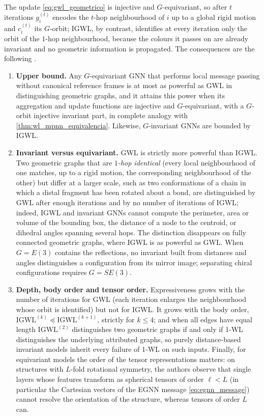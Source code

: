 The update \eqref{eq:gwl_geometrico} is injective and $G$-equivariant, so after $t$ iterations $g_i^{(t)}$ encodes the $t$-hop neighbourhood of $i$ up to a global rigid motion and $c_i^{(t)}$ its $G$-orbit; IGWL, by contrast, identifies at every iteration only the orbit of the $1$-hop neighbourhood, because the colours it passes on are already invariant and no geometric information is propagated. The consequences are the following \citep{joshi2023expressive}.
\begin{enumerate}
	\item \textbf{Upper bound.} Any $G$-equivariant \gls{GNN} that performs local message passing without canonical reference frames is at most as powerful as GWL in distinguishing geometric graphs, and it attains this power when its aggregation and update functions are injective and $G$-equivariant, with a $G$-orbit injective invariant part, in complete analogy with \autoref{thm:wl_mpnn_equivalencia}. Likewise, $G$-invariant \glspl{GNN} are bounded by IGWL.
	\item \textbf{Invariant versus equivariant.} GWL is strictly more powerful than IGWL. Two geometric graphs that are \textit{$1$-hop identical} (every local neighbourhood of one matches, up to a rigid motion, the corresponding neighbourhood of the other) but differ at a larger scale, such as two conformations of a chain in which a distal fragment has been rotated about a bond, are distinguished by GWL after enough iterations and by no number of iterations of IGWL; indeed, IGWL and invariant \glspl{GNN} cannot compute the perimeter, area or volume of the bounding box, the distance of a node to the centroid, or dihedral angles spanning several hops. The distinction disappears on fully connected geometric graphs, where IGWL is as powerful as GWL. When $G = E(3)$ contains the reflections, no invariant built from distances and angles distinguishes a configuration from its mirror image; separating chiral configurations requires $G = SE(3)$.
	\item \textbf{Depth, body order and tensor order.} Expressiveness grows with the number of iterations for GWL (each iteration enlarges the neighbourhood whose orbit is identified) but not for IGWL. It grows with the body order, $\mathrm{IGWL}^{(k)} \preceq \mathrm{IGWL}^{(k+1)}$, strictly for $k \leq 4$; and when all edges have equal length $\mathrm{IGWL}^{(2)}$ distinguishes two geometric graphs if and only if 1-WL distinguishes the underlying attributed graphs, so purely distance-based invariant models inherit every failure of 1-WL on such inputs. Finally, for equivariant models the order of the tensor representations matters: on structures with $L$-fold rotational symmetry, the authors observe that single layers whose features transform as spherical tensors of order $\ell < L$ (in particular the Cartesian vectors of the EGNN message \eqref{eq:egnn_message}) cannot resolve the orientation of the structure, whereas tensors of order $L$ can.
\end{enumerate}
